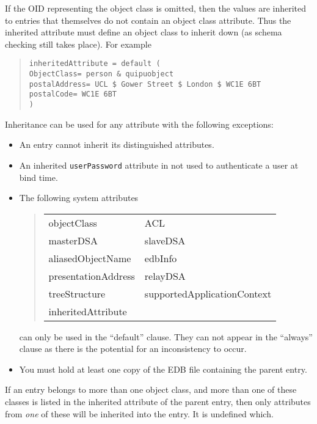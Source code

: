 If the OID representing the object class is omitted, then the values are
inherited to entries that themselves do not contain an object class
attribute. Thus the inherited attribute must define an object class to
inherit down (as schema checking still takes place).  For example
\begin{quote}\begin{verbatim}
inheritedAttribute = default (
ObjectClass= person & quipuobject
postalAddress= UCL $ Gower Street $ London $ WC1E 6BT
postalCode= WC1E 6BT
)
\end{verbatim}\end{quote}

Inheritance can be used for any attribute with the following exceptions:
\begin{itemize}

\item An entry cannot inherit its distinguished attributes.

\item An inherited \verb+userPassword+ attribute in not used to authenticate a user
at bind time.

\item The following system attributes 
\begin{quote}\small\begin{tabular}{ll}
objectClass &
ACL\\
masterDSA &
slaveDSA\\
aliasedObjectName &
edbInfo\\
presentationAddress &
relayDSA\\
treeStructure &
supportedApplicationContext\\
inheritedAttribute
\end{tabular}\end{quote}
can only be used in the ``default'' clause.  They can 
not appear in the ``always'' clause as there is the potential for
an inconsistency to occur.

\item You must hold at least one copy of the EDB file containing
the parent entry.

\end{itemize}

If an entry belongs to more than one object class, and more than one
of these classes is listed in the inherited attribute of the parent entry,
then only attributes from {\em one} of these will be inherited into the entry.
It is undefined which.

